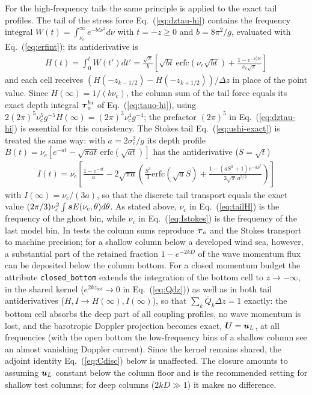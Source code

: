 \documentclass[12pt]{article}
\newcommand{\beq}  { \begin{eqnarray} }
\newcommand{\eeq}  { \end{eqnarray}}
\newcommand{\eq }  [1]{Eq.~(\ref{#1})}  %
\renewcommand{\v}[1]{{\mbox{\boldmath$ #1 $}}}  %
\begin{document}
For the high-frequency tails the same principle is applied to the exact tail
profiles. The tail of the stress force \eq{eq:dztau-hi} contains the frequency
integral $W(t) = \int_{\nu_c}^\infty e^{-b t \nu^2} d\nu$ with $t = -z \ge 0$ and $b
= 8 \pi^2/g$, evaluated with \eq{eq:erfint}; its antiderivative is
\beq \label{eq:tailH}
 H(t) = \int_0^t W(t') dt' = \frac{\sqrt{\pi}}{b} \left[ \sqrt{b t} \, 
 \mbox{erfc} \left( \nu_c \sqrt{b t} \right) 
 + \frac{1 - e^{-\nu_c^2 b t}}{\nu_c \sqrt{\pi}} \right]
\eeq
and each cell receives $\left( H(-z_{k-1/2}) - H(-z_{k+1/2}) \right)/\Delta z$
in place of the point value. Since $H(\infty) = 1/(b \nu_c)$, the column sum of
the tail force equals its exact depth integral $\v \tau_o^{hi}$ of
\eq{eq:tauo-hi}, using $2 (2 \pi)^5 \nu_c^5 g^{-5} H(\infty) = (2 \pi)^3 \nu_c^4
g^{-4}$; the prefactor $(2 \pi)^5$ in \eq{eq:dztau-hi} is essential for this
consistency. The Stokes tail \eq{eq:ushi-exact} is treated the same way: with
$a = 2 \sigma_c^2/g$ its depth profile $B(t) = \nu_c [ e^{-a t} - \sqrt{\pi a t}
\, \mbox{erfc}(\sqrt{a t}) ]$ has the antiderivative ($S = \sqrt{t}$)
\beq \label{eq:Istokes}
 I(t) = \nu_c \left[ \frac{1 - e^{-a t}}{a} - 2 \sqrt{\pi a} \left( 
 \frac{S^3}{3} \mbox{erfc}(\sqrt{a} S) 
 + \frac{1 - (a S^2 + 1) e^{-a S^2}}{3 \sqrt{\pi} \, a^{3/2}} \right) \right]
\eeq
with $I(\infty) = \nu_c/(3 a)$, so that the discrete tail transport equals the
exact value $(2\pi/3) \nu_c^2 \int \v s E(\nu_c,\theta) d\theta$.
As stated above, $\nu_c$ in \eq{eq:tailH} is the frequency of the ghost bin,
while $\nu_c$ in \eq{eq:Istokes} is the frequency of the last model bin. In tests the
column sums reproduce $\v \tau_o$ and the
Stokes transport to machine precision; for a shallow column below a
developed wind sea, however, a substantial part of the retained fraction $1 - e^{-2kD}$
of the wave momentum flux can be deposited below the column bottom. For a
closed momentum budget the attribute \verb|closed_bottom| extends the
integration of the bottom cell to $z \to -\infty$, in the shared kernel
($e^{2 k z_{bot}} \to 0$ in \eq{eq:Qdz}) as well as in both tail
antiderivatives ($H, I \to H(\infty), I(\infty)$), so that $\sum_k \bar Q_k
\Delta z = 1$ exactly: the bottom cell absorbs the deep part of all coupling
profiles, no wave momentum is lost, and the barotropic Doppler projection
becomes exact, $\v U = \v u_L$, at all frequencies (with the open bottom the
low-frequency bins of a shallow column see an almost vanishing Doppler
current). Since the kernel remains shared, the adjoint identity
\eq{eq:Cdisc} below is unaffected. The closure amounts to assuming $\v u_L$
constant below the column floor and is the recommended setting for shallow
test columns; for deep columns ($2 k D \gg 1$) it makes no difference.
\end{document}
